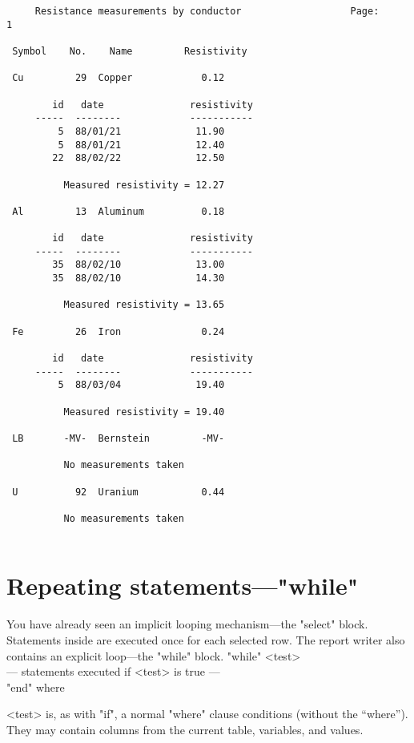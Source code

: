 \Rimdisp
\begin{verbatim}
     Resistance measurements by conductor                   Page:     1
 
 Symbol    No.    Name         Resistivity
 
 Cu         29  Copper            0.12
 
        id   date               resistivity
     -----  --------            -----------
         5  88/01/21             11.90
         5  88/01/21             12.40
        22  88/02/22             12.50
 
          Measured resistivity = 12.27
 
 Al         13  Aluminum          0.18
 
        id   date               resistivity
     -----  --------            -----------
        35  88/02/10             13.00
        35  88/02/10             14.30
 
          Measured resistivity = 13.65
 
 Fe         26  Iron              0.24
 
        id   date               resistivity
     -----  --------            -----------
         5  88/03/04             19.40
 
          Measured resistivity = 19.40
 
 LB       -MV-  Bernstein         -MV-
 
          No measurements taken
 
 U          92  Uranium           0.44
 
          No measurements taken
 
\end{verbatim}
\enddisp
 
\section{Repeating statements---"while"}
%
You have already seen an implicit looping mechanism---the "select"
block.  Statements inside are executed once for each selected row.
The report writer also contains an explicit loop---the "while" block.
\<"while" <test>\\
  --- statements executed if <test> is true ---\\
  "end" \>
where
\begin{List}
\item[<test>] is, as with "if", a normal
"where" clause conditions (without the
``where'').  They may contain columns from the current table,
variables, and values.
\end{List}
 
